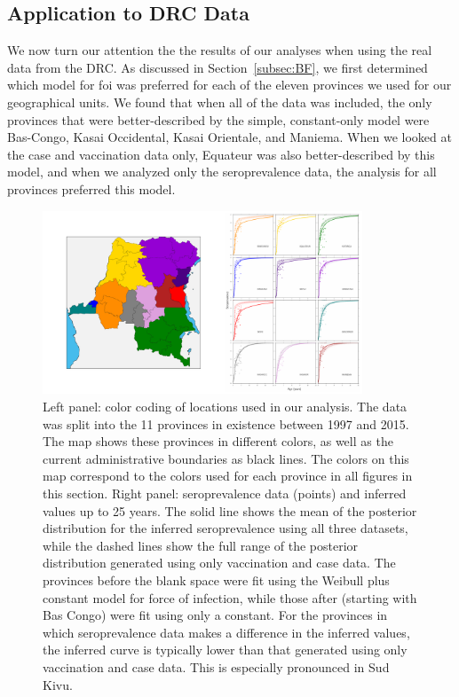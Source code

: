 \documentclass[nofootinbib,aps,pre,twocolumn,superscriptaddress,showkeys,showpacs]{revtex4-1}
\begin{document}
\subsection{Application to DRC Data \label{subsec:DRC}}
We now turn our attention the the results of our analyses when using the real data from the DRC. As discussed in Section~\ref{subsec:BF}, we first determined which model for foi was preferred for each of the eleven provinces we used for our geographical units. We found that when all of the data was included, the only provinces that were better-described by the simple, constant-only model were Bas-Congo, Kasai Occidental, Kasai Orientale, and Maniema. When we looked at the case and vaccination data only, Equateur was also better-described by this model, and when we analyzed only the seroprevalence data, the analysis for all provinces preferred this model. 

\begin{figure}
\includegraphics[width=0.85\textwidth,angle=0]{figures/SeroPlots-crop.pdf}
\caption{\label{fig:sero} Left panel: color coding of locations used in our analysis. The data was split into the 11 provinces in existence between 1997 and 2015. The map shows these provinces in different colors, as well as the current administrative boundaries as black lines. The colors on this map correspond to the colors used for each province in all figures in this section. Right panel: seroprevalence data (points) and inferred values up to 25 years. The solid line shows the mean of the posterior distribution for the inferred seroprevalence using all three datasets, while the dashed lines show the full range of the posterior distribution generated using only vaccination and case data. The provinces before the blank space were fit using the Weibull plus constant model for force of infection, while those after (starting with Bas Congo) were fit using only a constant. For the provinces in which seroprevalence data makes a difference in the inferred values, the inferred curve is typically lower than that generated using only vaccination and case data. This is especially pronounced in Sud Kivu.}
\end{figure}
\end{document}
